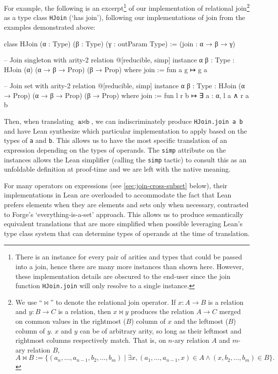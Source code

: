 For example, the following is an excerpt\footnote{There is an instance for every pair of arities and types that could be passed into a join, hence there are many more instances than shown here. However, these implementation details are obscured to the end-user since the join function \texttt{HJoin.join} will only resolve to a single instance.} of our implementation of relational join\footnote{We use ``$\bowtie$'' to denote the relational join operator. If $x: A \to B$ is a relation and $y: B \to C$ is a relation, then $x\bowtie y$ produces the relation $A\to C$ merged on common values in the rightmost ($B$) column of $x$ and the leftmost ($B$) column of $y$. $x$ and $y$ can be of arbitrary arity, so long as their leftmost and rightmost columns respectively match. That is, on $n$-ary relation $A$ and $m$-ary relation $B$, 
\[A \bowtie B := \{(a_n, \dots, a_{n-1}, b_2, \dots, b_m) \mid \exists x, (a_1, \dots, a_{n-1}, x)\in A \land (x, b_2, \dots, b_m)\in B\}.\]
} as a type class \texttt{HJoin} (`has join'), following our implementations of join from the examples demonstrated above: 

\begin{leanimpl*}
class HJoin (α : Type) (β : Type) (γ : outParam Type) :=
  (join : α → β → γ)

-- Join singleton with arity-2 relation
@[reducible, simp] instance {α β : Type} : HJoin (α) (α → β → Prop) (β → Prop) where
  join := fun a g ↦ g a

-- Join set with arity-2 relation
@[reducible, simp] instance {α β : Type} : HJoin (α → Prop) (α → β → Prop) (β → Prop) where
  join := fun l r b ↦ ∃ a : α, l a ∧ r a b
\end{leanimpl*}

Then, when translating $\texttt{a}\bowtie \texttt{b}$, we can indiscriminately produce \texttt{HJoin.join a b} and have Lean synthesize which particular implementation to apply based on the types of \texttt{a} and \texttt{b}. This allows us to have the most specific translation of an expression depending on the types of operands. The \texttt{simp} attribute on the instances allows the Lean simplifier (calling the \texttt{simp} tactic) to consult this as an unfoldable definition at proof-time and we are left with the native meaning.

For many operators on expressions (see \cref{sec:join-cross-subset} below), their implementations in Lean are overloaded to accommodate the fact that Lean prefers elements when they are elements and sets only when necessary, contrasted to Forge's `everything-is-a-set' approach. This allows us to produce semantically equivalent translations that are more simplified when possible leveraging Lean's type class system that can determine types of operands at the time of translation. 

